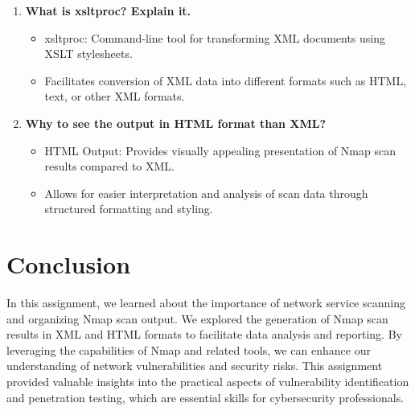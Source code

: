 \documentclass[11pt]{article}
\begin{document}
\begin{enumerate}
    \item \textbf{What is xsltproc? Explain it.}
          \begin{itemize}
              \item xsltproc: Command-line tool for transforming XML documents using XSLT stylesheets.
              \item Facilitates conversion of XML data into different formats such as HTML, text, or other XML formats.
          \end{itemize}

    \item \textbf{Why to see the output in HTML format than XML?}
          \begin{itemize}
              \item HTML Output: Provides visually appealing presentation of Nmap scan results compared to XML.
              \item Allows for easier interpretation and analysis of scan data through structured formatting and styling.
          \end{itemize}
\end{enumerate}


\section{Conclusion}
In this assignment, we learned about the importance of network service scanning and organizing Nmap scan output. We explored the generation of Nmap scan results in XML and HTML formats to facilitate data analysis and reporting. By leveraging the capabilities of Nmap and related tools, we can enhance our understanding of network vulnerabilities and security risks. This assignment provided valuable insights into the practical aspects of vulnerability identification and penetration testing, which are essential skills for cybersecurity professionals.
\clearpage

\pagebreak
\end{document}
